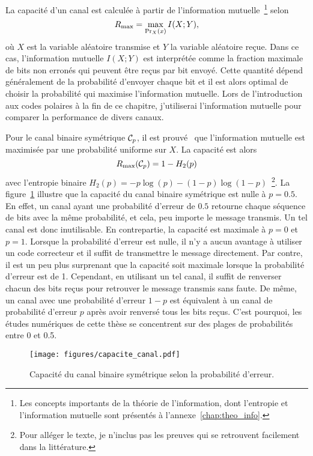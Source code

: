 La capacité d'un canal est calculée à partir de l'information mutuelle~\footnote{
  Les concepts importants de la théorie de l'information, dont l'entropie
  et l'information mutuelle sont présentés à l'annexe~\ref{chap:theo_info}.
} 
selon
\begin{equation}
  R_{\text{max}} = \max_{\Pr_X(x)} I(X ; Y),
\end{equation}
où $X$ est la variable aléatoire transmise et $Y$ la variable aléatoire reçue.
Dans ce cas,
l'information mutuelle $I(X ; Y)$ est interprétée comme la fraction maximale
de bits non erronés qui peuvent être reçus par bit envoyé.
Cette quantité dépend généralement de la probabilité d'envoyer chaque bit
et il est alors optimal de choisir la probabilité qui maximise l'information mutuelle.
Lors de l'introduction aux codes polaires à la fin de ce chapitre,
j'utiliserai l'information mutuelle pour comparer la performance de divers canaux.

Pour le canal binaire symétrique $\mathcal{C}_p$, 
il est prouvé~\cite{shannon_mathematical_1948} que l'information mutuelle
est maximisée par une probabilité uniforme sur $X$. 
La capacité est alors
\begin{equation}
  R_{\text{max}}(\mathcal{C}_p) = 1 - H_2(p)
\end{equation}
avec l'entropie binaire $H_2(p) = -p \log(p) - (1 - p)\log(1 - p)$~\footnote{
  Pour alléger le texte, je n'inclus pas les preuves qui se retrouvent facilement 
  dans la littérature.
}. 
La figure~\ref{fig:capacite_canal} illustre que la capacité du canal binaire symétrique est nulle à $p = 0.5$.
En effet, un canal ayant une probabilité d'erreur de $0.5$ retourne 
chaque séquence de bits avec la même probabilité,
et cela, peu importe le message transmis.
Un tel canal est donc inutilisable.
En contrepartie, la capacité est maximale à $p = 0$ et $p = 1$.
Lorsque la probabilité d'erreur est nulle,
il n'y a aucun avantage à utiliser un code correcteur 
et il suffit de transmettre le message directement.
Par contre, il est un peu plus surprenant que la capacité soit maximale lorsque la probabilité
d'erreur est de 1.
Cependant, en utilisant un tel canal, 
il suffit de renverser chacun des bits reçus pour retrouver le message transmis sans faute.
De même, 
un canal avec une probabilité d'erreur $1 - p$ est équivalent à un canal de probabilité d'erreur $p$
après avoir renversé tous les bits reçus.
C'est pourquoi, 
les études numériques de cette thèse se concentrent sur des plages de probabilités entre 0 et 0.5.

\begin{figure}
  \begin{center}
    \texttt{[image: figures/capacite\_canal.pdf]}
  \end{center}
  \caption[Capacité du canal binaire symétrique]{
    Capacité du canal binaire symétrique selon la probabilité d'erreur.
  }
  \label{fig:capacite_canal}
\end{figure}

